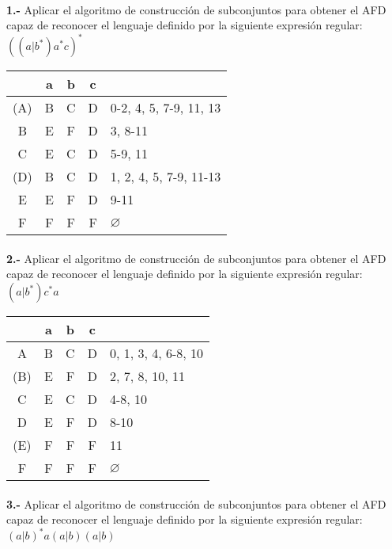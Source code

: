 \documentclass[11pt,a4paper]{report}
\begin{document}
\paragraph{}

\paragraph{}
\textbf{1.-} Aplicar el algoritmo de construcción de subconjuntos para obtener el AFD capaz de reconocer el lenguaje definido por la siguiente expresión regular: \textbf{$ ((a|b^*)a^*c)^* $} \\

\begin{tabular} {| c | c |c |c | l |}
\hline 
& a & b & c & \\ \hline
(A) & B & C & D & 0-2, 4, 5, 7-9, 11, 13\\ \hline
B & E & F & D & 3, 8-11\\ \hline
C & E & C & D & 5-9, 11\\ \hline
(D) & B & C & D & 1, 2, 4, 5, 7-9, 11-13\\ \hline
E & E & F & D & 9-11\\ \hline
F & F & F & F & $\varnothing$\\ \hline
\end{tabular}\paragraph{}
\textbf{2.-} Aplicar el algoritmo de construcción de subconjuntos para obtener el AFD capaz de reconocer el lenguaje definido por la siguiente expresión regular: \textbf{$ (a|b^*)c^*a $} \\

\begin{tabular} {| c | c |c |c | l |}
\hline 
& a & b & c & \\ \hline
A & B & C & D & 0, 1, 3, 4, 6-8, 10\\ \hline
(B) & E & F & D & 2, 7, 8, 10, 11\\ \hline
C & E & C & D & 4-8, 10\\ \hline
D & E & F & D & 8-10\\ \hline
(E) & F & F & F & 11\\ \hline
F & F & F & F & $\varnothing$\\ \hline
\end{tabular}\paragraph{}
\textbf{3.-} Aplicar el algoritmo de construcción de subconjuntos para obtener el AFD capaz de reconocer el lenguaje definido por la siguiente expresión regular: \textbf{$ (a|b)^*a(a|b)(a|b) $} \\
\end{document}

